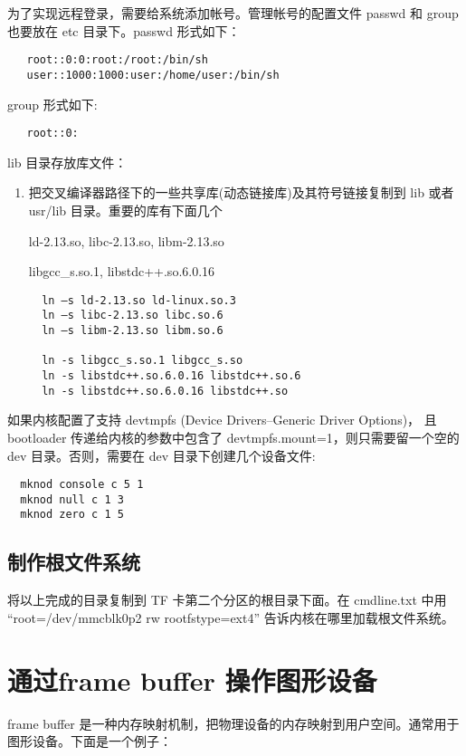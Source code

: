 \documentclass[nofonts]{ctexart}
\begin{document}
   为了实现远程登录，需要给系统添加帐号。管理帐号的配置文件 passwd 和 group
   也要放在 etc 目录下。passwd 形式如下：
   \begin{verbatim}
   root::0:0:root:/root:/bin/sh
   user::1000:1000:user:/home/user:/bin/sh
   \end{verbatim}

   group 形式如下:
   \begin{verbatim}
   root::0:
   \end{verbatim}

   lib 目录存放库文件：
\begin{enumerate}
  \item 把交叉编译器路径下的一些共享库(动态链接库)及其符号链接复制到 lib 或者
     usr/lib 目录。重要的库有下面几个

     ld-2.13.so, libc-2.13.so, libm-2.13.so

     libgcc\_s.so.1, libstdc++.so.6.0.16

  \begin{verbatim}
  ln –s ld-2.13.so ld-linux.so.3
  ln –s libc-2.13.so libc.so.6
  ln –s libm-2.13.so libm.so.6

  ln -s libgcc_s.so.1 libgcc_s.so
  ln -s libstdc++.so.6.0.16 libstdc++.so.6
  ln -s libstdc++.so.6.0.16 libstdc++.so
  \end{verbatim}
\end{enumerate}

   如果内核配置了支持 devtmpfs (Device Drivers--Generic Driver Options)，
     且bootloader 传递给内核的参数中包含了 devtmpfs.mount=1，则只需要留一个空的
	 dev 目录。否则，需要在 dev 目录下创建几个设备文件:

  \begin{verbatim}
  mknod console c 5 1
  mknod null c 1 3
  mknod zero c 1 5
  \end{verbatim}

\subsection{制作根文件系统}
  将以上完成的目录复制到 TF 卡第二个分区的根目录下面。在 cmdline.txt 中用
  ``root=/dev/mmcblk0p2 rw rootfstype=ext4'' 告诉内核在哪里加载根文件系统。


\section{通过frame buffer 操作图形设备}
frame buffer 是一种内存映射机制，把物理设备的内存映射到用户空间。通常用于
图形设备。下面是一个例子：
\end{document}
